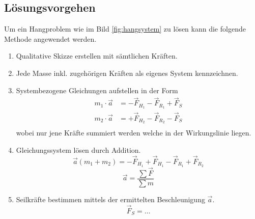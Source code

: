 \subsection{Lösungsvorgehen}
Um ein Hangproblem wie im Bild \ref{fig:hangsystem} zu lösen kann die folgende
Methode angewendet werden.
\begin{enumerate}
	\item Qualitative Skizze erstellen mit sämtlichen Kräften.
	\item Jede Masse inkl. zugehörigen Kräften als eigenes System kennzeichnen.
	\item Systembezogene Gleichungen aufstellen in der Form
		\[ \begin{array}{ll}
			m_1 \cdot \vec{a} & = -\vec{F}_{H_1} -\vec{F}_{R_1} +\vec{F}_S \\
			m_2 \cdot \vec{a} & = +\vec{F}_{H_2} -\vec{F}_{R_2} -\vec{F}_S \\
		\end{array} \]
		wobei nur jene Kräfte summiert werden welche in der Wirkungslinie liegen.
	\item Gleichungssystem lösen durch Addition.
		\[ \vec{a}(m_1 + m_2) = 
			-\vec{F}_{H_1} +\vec{F}_{H_1} -\vec{F}_{R_1} +\vec{F}_{R_2} \]
		\[  \vec{a} = \frac{\sum \vec{F}}{\sum m} \]
	\item Seilkräfte bestimmen mittels der ermittelten Beschleunigung $\vec{a}$.
		\[ \vec{F}_S = \dots \]
\end{enumerate}
